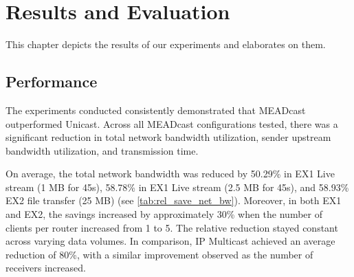 \chapter{Results and Evaluation} %
\label{chap:Evaluation}
This chapter depicts the results of our experiments and elaborates on them.
\section{Performance} %
\label{sec:Performance}
The experiments conducted consistently demonstrated that MEADcast outperformed
    Unicast.
Across all MEADcast configurations tested, there was a significant reduction in
    total network bandwidth utilization, sender upstream bandwidth utilization,
    and transmission time.

On average, the total network bandwidth was reduced by 50.29\% in EX1 Live
    stream (1 MB for 45s), 58.78\% in EX1 Live stream (2.5 MB for 45s), and
    58.93\% EX2 file transfer (25 MB) (see \autoref{tab:rel_save_net_bw}).
Moreover, in both EX1 and EX2, the savings increased by approximately 30\%
    when the number of clients per router increased from 1 to 5.
The relative reduction stayed constant across varying data volumes.
In comparison, IP Multicast achieved an average reduction of 80\%, with a
    similar improvement observed as the number of receivers increased.

